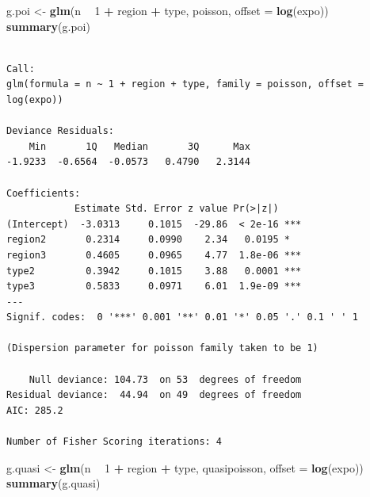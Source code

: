 \documentclass[
]{book}
\newenvironment{Shaded}{\begin{snugshade}}{\end{snugshade}}
\newcommand{\DataTypeTok}[1]{\textcolor[rgb]{0.13,0.29,0.53}{#1}}
\newcommand{\DecValTok}[1]{\textcolor[rgb]{0.00,0.00,0.81}{#1}}
\newcommand{\KeywordTok}[1]{\textcolor[rgb]{0.13,0.29,0.53}{\textbf{#1}}}
\newcommand{\NormalTok}[1]{#1}
\newcommand{\OperatorTok}[1]{\textcolor[rgb]{0.81,0.36,0.00}{\textbf{#1}}}
\newcommand{\StringTok}[1]{\textcolor[rgb]{0.31,0.60,0.02}{#1}}
\begin{document}
\begin{Shaded}
\begin{Highlighting}[]
\NormalTok{g.poi <-}\StringTok{ }\KeywordTok{glm}\NormalTok{(n }\OperatorTok{~}\StringTok{ }\DecValTok{1} \OperatorTok{+}\StringTok{ }\NormalTok{region }\OperatorTok{+}\StringTok{ }\NormalTok{type, poisson, }\DataTypeTok{offset =} \KeywordTok{log}\NormalTok{(expo))}
\KeywordTok{summary}\NormalTok{(g.poi)}
\end{Highlighting}
\end{Shaded}

\begin{verbatim}

Call:
glm(formula = n ~ 1 + region + type, family = poisson, offset = log(expo))

Deviance Residuals: 
    Min       1Q   Median       3Q      Max  
-1.9233  -0.6564  -0.0573   0.4790   2.3144  

Coefficients:
            Estimate Std. Error z value Pr(>|z|)    
(Intercept)  -3.0313     0.1015  -29.86  < 2e-16 ***
region2       0.2314     0.0990    2.34   0.0195 *  
region3       0.4605     0.0965    4.77  1.8e-06 ***
type2         0.3942     0.1015    3.88   0.0001 ***
type3         0.5833     0.0971    6.01  1.9e-09 ***
---
Signif. codes:  0 '***' 0.001 '**' 0.01 '*' 0.05 '.' 0.1 ' ' 1

(Dispersion parameter for poisson family taken to be 1)

    Null deviance: 104.73  on 53  degrees of freedom
Residual deviance:  44.94  on 49  degrees of freedom
AIC: 285.2

Number of Fisher Scoring iterations: 4
\end{verbatim}

\begin{Shaded}
\begin{Highlighting}[]
\NormalTok{g.quasi <-}\StringTok{ }\KeywordTok{glm}\NormalTok{(n }\OperatorTok{~}\StringTok{ }\DecValTok{1} \OperatorTok{+}\StringTok{ }\NormalTok{region }\OperatorTok{+}\StringTok{ }\NormalTok{type, quasipoisson, }\DataTypeTok{offset =} \KeywordTok{log}\NormalTok{(expo))}
\KeywordTok{summary}\NormalTok{(g.quasi)}
\end{Highlighting}
\end{Shaded}
\end{document}
